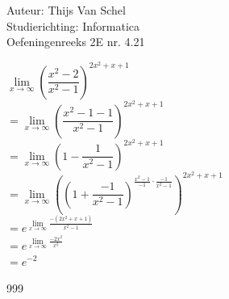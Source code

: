 \documentclass[a4paper]{article}
\begin{document}
  
\noindent \large Auteur: Thijs Van Schel\\
\noindent \large Studierichting: Informatica\\
\noindent \large Oefeningenreeks 2E nr. 4.21\\

\medskip
\normalsize

$\lim\limits_{x \to \infty} \left( \dfrac{x^2 - 2}{x^2 - 1} \right)^{2x^2 + x + 1}$  \\

$= \lim\limits_{x \to \infty} \left( \dfrac{x^2 - 1 - 1}{x^2 - 1} \right)^{2x^2 + x + 1}$  \\

$= \lim\limits_{x \to \infty} \left( 1 - \dfrac{1}{x^2 - 1} \right)^{2x^2 + x + 1}$  \\

$= \lim\limits_{x \to \infty} \left( \left( 1 + \dfrac{-1}{x^2 - 1} \right)^{\tfrac{x^2 - 1}{-1} \cdot \tfrac{-1}{x^2 - 1}} \right)^{2x^2 + x + 1}$  \\

$= e^{\lim\limits_{x \to \infty} \tfrac{-(2x^2 + x + 1)}{x^2 - 1}}$  \\

$= e^{\lim\limits_{x \to \infty} \tfrac{-2x^2}{x^2}} $ \\

$= e^{-2} $

\begin{thebibliography}{999}
\end{thebibliography}
\end{document}
